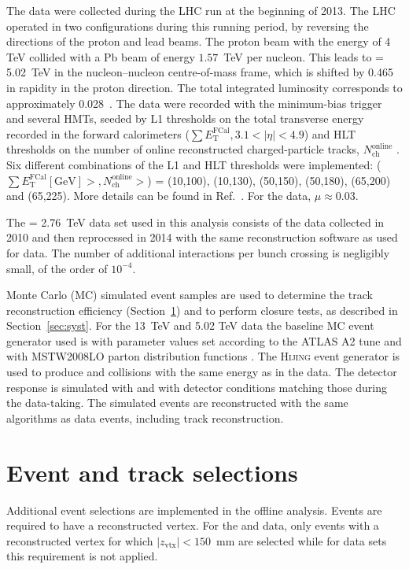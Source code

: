 \documentclass[cernpreprint,texlive=2014,txfonts,UKenglish]{latex/atlasdoc}
\begin{document}
The \pPb data were collected during the LHC run at the beginning of 2013. The  LHC operated in two configurations during this running period, by reversing the directions of the proton and lead beams. The proton beam with the  energy of 4 TeV collided with a Pb beam of energy  $1.57$~TeV per nucleon. This leads to \sqn = 5.02~TeV in the nucleon--nucleon centre-of-mass frame, which is shifted by 0.465 in rapidity in the proton direction.  The total integrated luminosity corresponds to approximately 0.028~\ipb. The data were recorded with the minimum-bias trigger and several HMTs, seeded by L1 thresholds on the total transverse energy recorded in the forward calorimeters ($\sum E_{\mathrm{T}}^{\mathrm{FCal}}, 3.1 < |\eta| < 4.9$) and HLT thresholds on the number of online reconstructed charged-particle tracks, $N_{\mathrm{ch}}^{\mathrm{online}}$ \cite{ATLAS-CONF-2013-104}. Six different combinations of the L1 and HLT thresholds were implemented: ($\sum E_{\mathrm{T}}^{\mathrm{FCal}} [\mathrm{GeV}] >, N_{\mathrm{ch}}^{\mathrm{online}} >$) = (10,100), (10,130), (50,150), (50,180), (65,200) and (65,225). More details can be found in Ref.~\cite{pPbatlas3}. For the \pPb data, $\mu \approx 0.03$. 

The \sqn= 2.76~TeV \PbPb data set used in this analysis consists of the data collected in 2010 and then reprocessed in 2014 with the same reconstruction software as used for \pPb data. The number of additional interactions per bunch crossing is negligibly small, of the order of $10^{-4}$. 

Monte Carlo (MC) simulated event samples are used to determine the track reconstruction efficiency (Section~\ref{sec:selections}) and to perform  closure tests, as described in Section~\ref{sec:syst}. For the  13~TeV and 5.02 TeV  \pp data the baseline MC event generator used is   \cite{pythia8} with parameter values set according to the ATLAS A2 tune \cite{ATL-PHYS-PUB-2011-009} and with MSTW2008LO parton distribution functions \cite{MSTW2008}. The \textsc{Hijing}
 event generator \cite{hijing} is used to produce \pPb and \PbPb collisions with the same energy  as in the data. 
The detector response is simulated  \cite{AtlasInfra} with  \cite{geant} and with detector conditions matching those during the data-taking. The simulated events are reconstructed with the same algorithms as data events, including track reconstruction.  
\section{Event and track selections}
\label{sec:selections}
Additional event selections are implemented in the offline analysis.
Events are required to have a reconstructed vertex.   For the \pPb and \PbPb data, only events with a reconstructed vertex for which $|z_{\mathrm{vtx}}| < 150$~mm are selected while for \pp data sets this requirement is not applied. 
\end{document}
